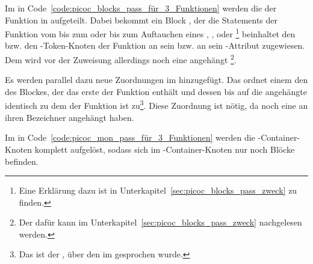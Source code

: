 Im  in Code~\ref{code:picoc_blocks_pass_für_3_Funktionen} werden die  der Funktion in   aufgeteilt. Dabei bekommt ein Block , der die Statements der Funktion vom  bis zum  oder bis zum Auftauchen eines , ,  oder \footnote{Eine Erklärung dazu ist in Unterkapitel~\ref{sec:picoc_blocks_pass_zweck} zu finden.} beinhaltet den  bzw. den -Token-Knoten der Funktion an sein  bzw. an sein -Attribut zugewiesen. Dem  wird vor der Zuweisung allerdings noch eine  angehängt \footnote{Der  dafür kann im Unterkapitel~\ref{sec:picoc_blocks_pass_zweck} nachgelesen werden.}.

Es werden parallel dazu neue Zuordnungen im   hinzugefügt. Das  ordnet einem  den  des Blockes, der das erste  der Funktion enthält und dessen   bis auf die angehängte  identisch zu dem der Funktion ist zu\footnote{Das ist der , über den im  gesprochen wurde.}. Diese Zuordnung ist nötig, da  noch eine  an ihren Bezeichner  angehängt haben.


\begin{code}
  \centering
  \caption{PicoC-Blocks Pass für 3 Funktionen}
  \label{code:picoc_blocks_pass_für_3_Funktionen}
\end{code}

Im  in Code~\ref{code:picoc_mon_pass_für_3_Funktionen} werden die -Container-Knoten komplett aufgelöst, sodass sich im -Container-Knoten nur noch Blöcke befinden.

